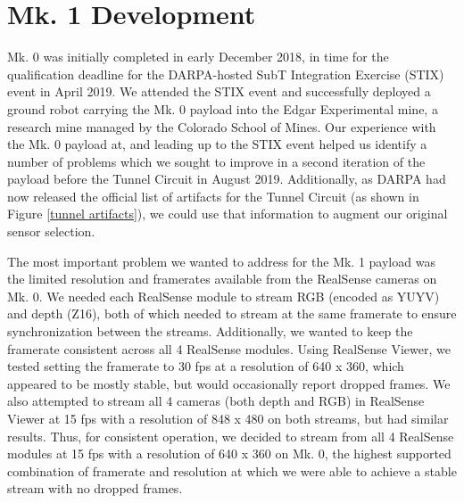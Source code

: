 \section{Mk. 1 Development}

Mk. 0 was initially completed in early December 2018, in time for the qualification deadline for the DARPA-hosted SubT Integration Exercise (STIX) event in April 2019. We attended the STIX event and successfully deployed a ground robot carrying the Mk. 0 payload into the Edgar Experimental mine, a research mine managed by the Colorado School of Mines. Our experience with the Mk. 0 payload at, and leading up to the STIX event helped us identify a number of problems which we sought to improve in a second iteration of the payload before the Tunnel Circuit in August 2019. Additionally, as DARPA had now released the official list of artifacts for the Tunnel Circuit (as shown in Figure \ref{tunnel artifacts}), we could use that information to augment our original sensor selection.

The most important problem we wanted to address for the Mk. 1 payload was the limited resolution and framerates available from the RealSense cameras on Mk. 0. We needed each RealSense module to stream RGB (encoded as YUYV) and depth (Z16), both of which needed to stream at the same framerate to ensure synchronization between the streams. Additionally, we wanted to keep the framerate consistent across all 4 RealSense modules. Using RealSense Viewer, we tested setting the framerate to 30 fps at a resolution of 640 x 360, which appeared to be mostly stable, but would occasionally report dropped frames. We also attempted to stream all 4 cameras (both depth and RGB) in RealSense Viewer at 15 fps with a resolution of 848 x 480 on both streams, but had similar results. Thus, for consistent operation, we decided to stream from all 4 RealSense modules at 15 fps with a resolution of 640 x 360 on Mk. 0, the highest supported combination of framerate and resolution at which we were able to achieve a stable stream with no dropped frames.

